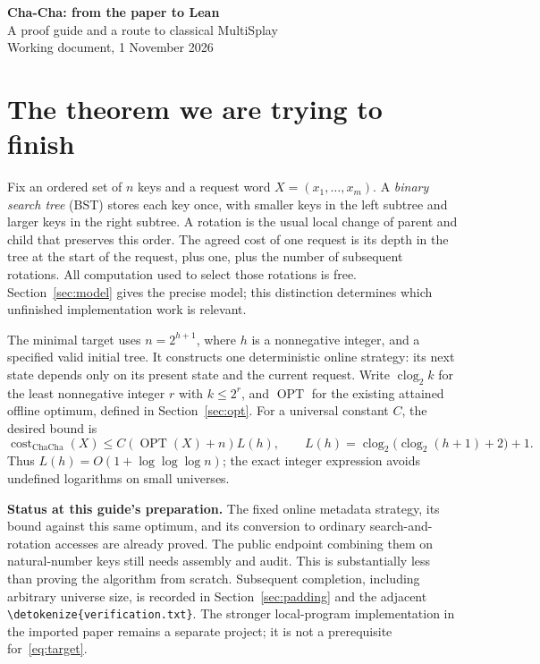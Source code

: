 \documentclass[11pt,a4paper]{article}
\newcommand{\OPT}{\operatorname{OPT}}
\newcommand{\cost}{\operatorname{cost}}
\newcommand{\clog}{\operatorname{clog}_2}
\newcommand{\lean}[1]{{\small\expandafter\nolinkurl\expandafter{\detokenize{#1}}}}
\begin{document}
\begin{center}
{\Large\bfseries Cha-Cha: from the paper to Lean}\\[4pt]
{\large A proof guide and a route to classical MultiSplay}\\[3pt]
Working document, 1 November 2026
\end{center}

\section{The theorem we are trying to finish}\label{sec:scope}
Fix an ordered set of $n$ keys and a request word $X=(x_1,\ldots,x_m)$.
A \emph{binary search tree} (BST) stores each key once, with smaller keys
in the left subtree and larger keys in the right subtree. A rotation is
the usual local change of parent and child that preserves this order.
The agreed cost of one request is its depth in the tree at the start of
the request, plus one, plus the number of subsequent rotations. All
computation used to select those rotations is free. Section~\ref{sec:model}
gives the precise model; this distinction determines which unfinished
implementation work is relevant.

The minimal target uses $n=2^{h+1}$, where $h$ is a nonnegative integer,
and a specified valid initial tree. It constructs one deterministic online
strategy: its next state depends only on its present state and the current
request. Write $\clog k$ for the least nonnegative integer $r$ with
$k\le2^r$, and $\OPT$ for the existing attained offline optimum, defined
in Section~\ref{sec:opt}. For a universal constant $C$, the desired bound is
\begin{equation}\label{eq:target}
 \cost_{\mathrm{ChaCha}}(X)\le C(\OPT(X)+n)L(h),\qquad
 L(h)=\clog\bigl(\clog(h+1)+2\bigr)+1.
\end{equation}
Thus $L(h)=O(1+\log\log\log n)$; the exact integer
expression avoids undefined logarithms on small universes.

\textbf{Status at this guide's preparation.} The fixed online metadata
strategy, its bound against this same optimum, and its conversion to
ordinary search-and-rotation accesses are already proved. The public
endpoint combining them on natural-number keys still needs assembly and
audit. This is substantially less than proving the algorithm from scratch.
Subsequent completion, including arbitrary universe size, is recorded in
Section~\ref{sec:padding} and the adjacent \lean{verification.txt}.
The stronger local-program implementation in the imported paper remains
a separate project; it is not a prerequisite for~\eqref{eq:target}.
\end{document}
